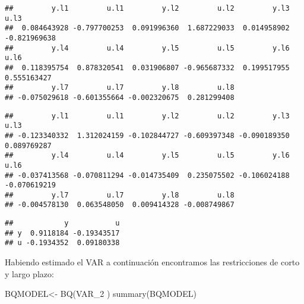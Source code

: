 \documentclass[
]{book}
\newenvironment{Shaded}{\begin{snugshade}}{\end{snugshade}}
\newcommand{\FunctionTok}[1]{\textcolor[rgb]{0.00,0.00,0.00}{#1}}
\newcommand{\NormalTok}[1]{#1}
\newcommand{\OtherTok}[1]{\textcolor[rgb]{0.56,0.35,0.01}{#1}}
\newcommand{\SpecialCharTok}[1]{\textcolor[rgb]{0.00,0.00,0.00}{#1}}
\begin{document}
\begin{verbatim}
##         y.l1         u.l1         y.l2         u.l2         y.l3         u.l3 
##  0.084643928 -0.797700253  0.091996360  1.687229033  0.014958902 -0.821969638 
##         y.l4         u.l4         y.l5         u.l5         y.l6         u.l6 
##  0.118395754  0.878320541  0.031906807 -0.965687332  0.199517955  0.555163427 
##         y.l7         u.l7         y.l8         u.l8 
## -0.075029618 -0.601355664 -0.002320675  0.281299408
\end{verbatim}

\begin{Shaded}
\end{Shaded}

\begin{verbatim}
##         y.l1         u.l1         y.l2         u.l2         y.l3         u.l3 
## -0.123340332  1.312024159 -0.102844727 -0.609397348 -0.090189350  0.089769287 
##         y.l4         u.l4         y.l5         u.l5         y.l6         u.l6 
## -0.037413568 -0.070811294 -0.014735409  0.235075502 -0.106024188 -0.070619219 
##         y.l7         u.l7         y.l8         u.l8 
## -0.004578130  0.063548050  0.009414328 -0.008749867
\end{verbatim}

\begin{Shaded}
\end{Shaded}

\begin{verbatim}
##            y           u
## y  0.9118184 -0.19343517
## u -0.1934352  0.09180338
\end{verbatim}

Habiendo estimado el VAR a continuación encontramos las restricciones de corto y largo plazo:

\begin{Shaded}
\begin{Highlighting}[]
\NormalTok{BQMODEL}\OtherTok{\textless{}{-}} \FunctionTok{BQ}\NormalTok{(VAR\_2 )}
\FunctionTok{summary}\NormalTok{(BQMODEL)}
\end{Highlighting}
\end{Shaded}
\end{document}
